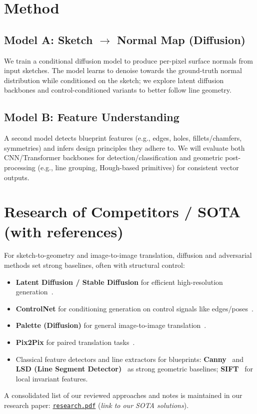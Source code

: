 \documentclass[11pt,a4paper]{article}
\begin{document}

\section{Method}
\subsection{Model A: Sketch $\rightarrow$ Normal Map (Diffusion)}
We train a conditional diffusion model to produce per-pixel surface normals from input sketches. The model learns to denoise towards the ground-truth normal distribution while conditioned on the sketch; we explore latent diffusion backbones and control-conditioned variants to better follow line geometry.

\subsection{Model B: Feature Understanding}
A second model detects blueprint features (e.g., edges, holes, fillets/chamfers, symmetries) and infers design principles they adhere to. We will evaluate both CNN/Transformer backbones for detection/classification and geometric post-processing (e.g., line grouping, Hough-based primitives) for consistent vector outputs.

\section{Research of Competitors / SOTA (with references)}
For sketch-to-geometry and image-to-image translation, diffusion and adversarial methods set strong baselines, often with structural control:
\begin{itemize}[leftmargin=*]
  \item \textbf{Latent Diffusion / Stable Diffusion} for efficient high-resolution generation~\cite{rombach2022latent}.
  \item \textbf{ControlNet} for conditioning generation on control signals like edges/poses~\cite{zhang2023adding}.
  \item \textbf{Palette (Diffusion)} for general image-to-image translation~\cite{saharia2022palette}.
  \item \textbf{Pix2Pix} for paired translation tasks~\cite{isola2017image}.
  \item Classical feature detectors and line extractors for blueprints: \textbf{Canny}~\cite{canny1986} and \textbf{LSD (Line Segment Detector)}~\cite{vonGioi2008lsd} as strong geometric baselines; \textbf{SIFT}~\cite{lowe2004distinctive} for local invariant features.
\end{itemize}
A consolidated list of our reviewed approaches and notes is maintained in our research paper: \href{https://github.com/touch-topnotch/sketch-vision/blob/main/docs/sketch-vision-eng.pdf}{\texttt{research.pdf}} (\emph{link to our SOTA solutions}).
\end{document}
